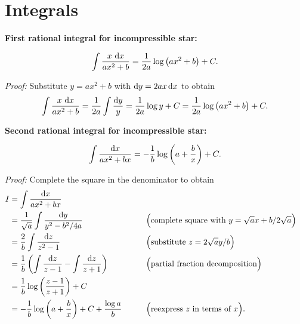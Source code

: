 

\chapter{Integrals}
\label{chap:integrals}

\newcommand\formulawithcomment[4]{%
\textbf{#1:}
#2
\textit{#3:} #4
}

\newcommand\formulawithproof[3]{\formulawithcomment{#1}{#2}{Proof}{#3}}
\newcommand\formulawithreference[3]{\formulawithcomment{#1}{#2}{Reference}{#3}}

\formulawithproof{First rational integral for incompressible star}{
\begin{equation}
	\int \frac{x \, \mathop{}\!\mathrm{d} x}{ax^2 + b} = \frac{1}{2a} \log \left( a x^2 + b \right) + C .
	\label{eq:integrals:logarithm_xnum}
\end{equation}
}{
	Substitute $y = a x^2 + b$ with $\mathop{}\!\mathrm{d} y = 2 a x \mathop{}\!\mathrm{d} x$ to obtain
	\begin{equation*}
		\int \frac{x \, \mathop{}\!\mathrm{d} x}{ax^2 + b} = \frac{1}{2a} \int \frac{\mathop{}\!\mathrm{d} y}{y} = \frac{1}{2a} \log y + C = \frac{1}{2a} \log \left( a x^2 + b \right) + C .
	\end{equation*}
}

\formulawithproof{Second rational integral for incompressible star}{
\begin{equation}
	\int \frac{\mathop{}\!\mathrm{d} x}{ax^2 + bx} = -\frac{1}{b} \log \left( a + \frac{b}{x} \right) + C .
	\label{eq:integrals:logarithm_1num}
\end{equation}
}{
	Complete the square in the denominator to obtain
	\begin{align*}
		I &= \int \frac{\mathop{}\!\mathrm{d} x}{ax^2 + bx} \\
		  &= \frac{1}{\sqrt{a}} \int \frac{\mathop{}\!\mathrm{d} y}{y^2 - b^2 / 4a} & \qquad & \Big( \text{complete square with } y = \sqrt{a} x + b / 2 \sqrt{a} \Big) \\
		  &= \frac{2}{b} \int \frac{\mathop{}\!\mathrm{d} z}{z^2 - 1} & \qquad & \Big( \text{substitute } z = 2 \sqrt{a} y / b \Big) \\
		  &= \frac{1}{b} \left( \int \frac{\mathop{}\!\mathrm{d} z}{z-1} - \int \frac{\mathop{}\!\mathrm{d} z}{z+1} \right) & \qquad & \Big( \text{partial fraction decomposition} \Big) \\
		  &= \frac{1}{b} \log \left( \frac{z-1}{z+1} \right) + C \\
		  &= -\frac{1}{b} \log \left( a + \frac{b}{x} \right) + C + \frac{\log a}{b} & \qquad & \Big( \text{reexpress $z$ in terms of $x$} \Big) . \\
	\end{align*}
}

